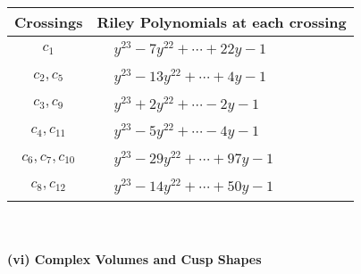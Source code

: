 \documentclass[1p]{elsarticle_modified}
\theoremstyle{definition}
\begin{document}
\begin{tabular}{m{50pt}|m{274pt}}
Crossings & \hspace{64pt}Riley Polynomials at each crossing \\
\hline $$\begin{aligned}c_{1}\end{aligned}$$&$\begin{aligned}
&y^{23}-7 y^{22}+\cdots+22 y-1
\end{aligned}$\\
\hline $$\begin{aligned}c_{2},c_{5}\end{aligned}$$&$\begin{aligned}
&y^{23}-13 y^{22}+\cdots+4 y-1
\end{aligned}$\\
\hline $$\begin{aligned}c_{3},c_{9}\end{aligned}$$&$\begin{aligned}
&y^{23}+2 y^{22}+\cdots-2 y-1
\end{aligned}$\\
\hline $$\begin{aligned}c_{4},c_{11}\end{aligned}$$&$\begin{aligned}
&y^{23}-5 y^{22}+\cdots-4 y-1
\end{aligned}$\\
\hline $$\begin{aligned}c_{6},c_{7},c_{10}\end{aligned}$$&$\begin{aligned}
&y^{23}-29 y^{22}+\cdots+97 y-1
\end{aligned}$\\
\hline $$\begin{aligned}c_{8},c_{12}\end{aligned}$$&$\begin{aligned}
&y^{23}-14 y^{22}+\cdots+50 y-1
\end{aligned}$\\
\hline
\end{tabular}\\~\\
\newpage\flushleft \textbf{(vi) Complex Volumes and Cusp Shapes}
\end{document}
